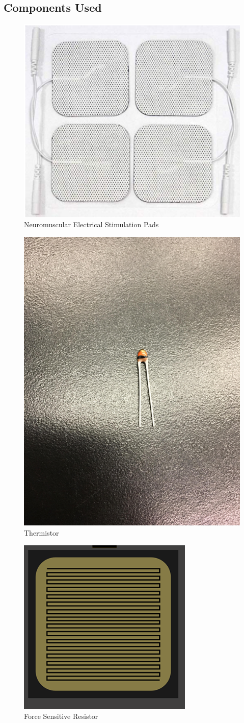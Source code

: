 \documentclass[11.5pt]{article}
\begin{document}
\subsection{Components Used}
\begin{figure}[H]
    \centering
    \includegraphics[width=0.5\linewidth]{Appendix/EMSP.PNG}
    \caption{Neuromuscular Electrical Stimulation Pads}
    \label{fig:EMSP}
\end{figure}
\vspace{0.5mm}

\begin{figure}[H]
    \centering
    \includegraphics[width=0.5\linewidth]{Appendix/THERM.jpg}
    \caption{Thermistor}
    \label{fig:therm}
\end{figure}
\vspace{0.5mm}

\newpage

\begin{figure}[H]
    \centering
    \includegraphics[width=0.5\linewidth]{Appendix/FSR.PNG}
    \caption{Force Sensitive Resistor}
    \label{fig:FSR}
\end{figure}
\vspace{0.5mm}
\end{document}
